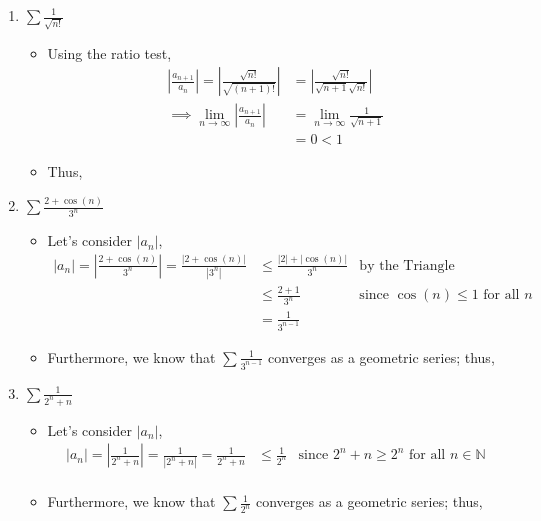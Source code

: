 \documentclass[10pt,a4paper]{article}
\theoremstyle{definition}
\begin{document}
\begin{enumerate}[label = (\alph*)]
\item $\displaystyle \sum \frac{1}{\sqrt{n!}}$
	\begin{itemize}
	\item Using the ratio test,
	\begin{align*}
	\left|\frac{a_{n+1}}{a_n}\right| = \left|\frac{\sqrt{n!}}{\sqrt{(n+1)!}}\right| &= \left|\frac{\sqrt{n!}}{\sqrt{n + 1}\sqrt{n!}}\right|\\
	\implies \lim_{n \to \infty} \left|\frac{a_{n+1}}{a_n}\right| &= \lim_{n \to \infty} \frac{1}{\sqrt{n + 1}}\\
	&= 0 < 1
	\end{align*}
	\item Thus, 
	\end{itemize}
\item $\displaystyle \sum \frac{2 + \cos(n)}{3^n}$
	\begin{itemize}
	\item Let's consider $|a_n|$,
	\begin{align*}
	|a_n| = \left|\frac{2 + \cos(n)}{3^n}\right| = \frac{|2 + \cos(n)|}{|3^n|} &\leq \frac{|2| + |\cos(n)|}{3^n} &\text{by the Triangle Inequality}\\
	&\leq \frac{2 + 1}{3^n} &\text{since $\cos(n) \leq 1$ for all $n$}\\
	&= \frac{1}{3^{n-1}}
	\end{align*}
	\item Furthermore, we know that $\displaystyle \sum \frac{1}{3^{n-1}}$ converges as a geometric series; thus, \\
	\end{itemize}
\item $\displaystyle \sum \frac{1}{2^n + n}$
	\begin{itemize}
	\item Let's consider $|a_n|$,
	\begin{align*}
	|a_n| = \left|\frac{1}{2^n + n}\right| = \frac{1}{|2^n + n|} = \frac{1}{2^n + n} &\leq \frac{1}{2^n} &\text{since $2^n + n \geq 2^n$ for all $n \in \mathbb{N}$}\\
	\end{align*}
	\item Furthermore, we know that $\displaystyle \sum \frac{1}{2^n}$ converges as a geometric series; thus, \\

\end{itemize}
\end{enumerate}
\end{document}
